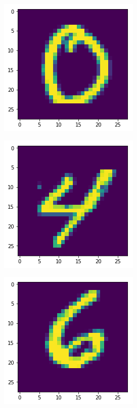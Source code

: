 \begin{figure}[H]
\centering
\begin{subfigure}{.3\linewidth}
 \centering
 \includegraphics[scale=0.4]{chapter_3_figures/mnist_0.png}
\end{subfigure}
 \hfill
\begin{subfigure}{.3\linewidth}
 \centering
 \includegraphics[scale=0.4]{chapter_3_figures/mnist_4.png}
\end{subfigure}
 \hfill
\begin{subfigure}{.3\linewidth}
 \centering
 \includegraphics[scale=0.4]{chapter_3_figures/mnist_6.png}
\end{subfigure}


\end{figure}
